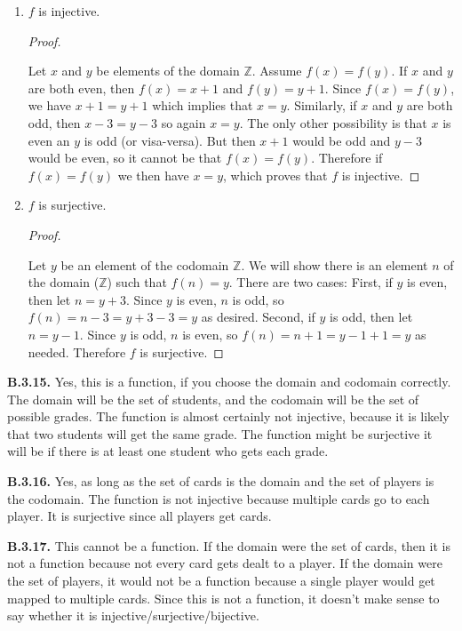 \documentclass[10pt,]{book}
\theoremstyle{plain}
\theoremstyle{definition}
\theoremstyle{definition}
\theoremstyle{definition}
\theoremstyle{definition}
\numberwithin{equation}{chapter}
\def\Z{\mathbb Z}
\begin{document}
\begin{enumerate}[label=(\alph*)]
\item\hypertarget{li-639}{}\hypertarget{p-1880}{}%
\(f\) is injective.%
\begin{proof}\hypertarget{proof-18}{}
\hypertarget{p-1881}{}%
Let \(x\) and \(y\) be elements of the domain \(\Z\). Assume \(f(x) = f(y)\). If \(x\) and \(y\) are both even, then \(f(x) = x+1\) and \(f(y) = y+1\). Since \(f(x) = f(y)\), we have \(x + 1 = y + 1\) which implies that \(x = y\). Similarly, if \(x\) and \(y\) are both odd, then \(x - 3 = y-3\) so again \(x = y\). The only other possibility is that \(x\) is even an \(y\) is odd (or visa-versa). But then \(x + 1\) would be odd and \(y - 3\) would be even, so it cannot be that \(f(x) = f(y)\). Therefore if \(f(x) = f(y)\) we then have \(x = y\), which proves that \(f\) is injective.%
\end{proof}
\item\hypertarget{li-640}{}\hypertarget{p-1882}{}%
\(f\) is surjective.%
\begin{proof}\hypertarget{proof-19}{}
\hypertarget{p-1883}{}%
Let \(y\) be an element of the codomain \(\Z\). We will show there is an element \(n\) of the domain (\(\Z\)) such that \(f(n) = y\). There are two cases: First, if \(y\) is even, then let \(n = y+3\). Since \(y\) is even, \(n\) is odd, so \(f(n) = n-3 = y+3-3 = y\) as desired. Second, if \(y\) is odd, then let \(n = y-1\). Since \(y\) is odd, \(n\) is even, so \(f(n) = n+1 = y-1+1 = y\) as needed. Therefore \(f\) is surjective.%
\end{proof}
\end{enumerate}
%
\par\smallskip
\noindent\textbf{B.3.15.} \hypertarget{p-1885}{}%
Yes, this is a function, if you choose the domain and codomain correctly. The domain will be the set of students, and the codomain will be the set of possible grades. The function is almost certainly not injective, because it is likely that two students will get the same grade. The function might be surjective \textendash{} it will be if there is at least one student who gets each grade.%
\par\smallskip
\noindent\textbf{B.3.16.} \hypertarget{p-1887}{}%
Yes, as long as the set of cards is the domain and the set of players is the codomain. The function is not injective because multiple cards go to each player. It is surjective since all players get cards.%
\par\smallskip
\noindent\textbf{B.3.17.} \hypertarget{p-1889}{}%
This cannot be a function. If the domain were the set of cards, then it is not a function because not every card gets dealt to a player. If the domain were the set of players, it would not be a function because a single player would get mapped to multiple cards. Since this is not a function, it doesn't make sense to say whether it is injective/surjective/bijective.%
\par\smallskip
\end{document}
